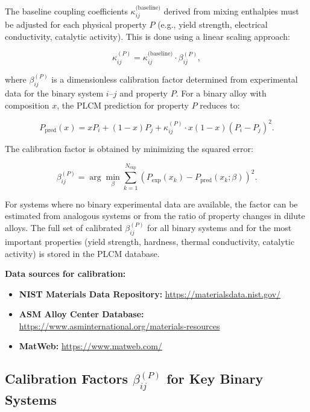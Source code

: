 \documentclass[12pt,a4paper]{article}
\begin{document}
	The baseline coupling coefficients \(\kappa_{ij}^{\text{(baseline)}}\) derived from mixing enthalpies must be adjusted for each physical property \(P\) (e.g., yield strength, electrical conductivity, catalytic activity). This is done using a linear scaling approach:
	
	\begin{equation}
		\kappa_{ij}^{(P)} = \kappa_{ij}^{\text{(baseline)}} \cdot \beta_{ij}^{(P)},
		\label{eq:kappa-calibration}
	\end{equation}
	
	where \(\beta_{ij}^{(P)}\) is a dimensionless calibration factor determined from experimental data for the binary system \(i\)–\(j\) and property \(P\). For a binary alloy with composition \(x\), the PLCM prediction for property \(P\) reduces to:
	
	\begin{equation}
		P_{\text{pred}}(x) = x P_i + (1-x) P_j + \kappa_{ij}^{(P)} \cdot x(1-x) (P_i - P_j)^2.
		\label{eq:binary-prediction}
	\end{equation}
	
	The calibration factor is obtained by minimizing the squared error:
	
	\begin{equation}
		\beta_{ij}^{(P)} = \arg\min_{\beta} \sum_{k=1}^{N_{\text{exp}}} \left( P_{\text{exp}}(x_k) - P_{\text{pred}}(x_k;\beta) \right)^2.
		\label{eq:beta-optimization}
	\end{equation}
	
	For systems where no binary experimental data are available, the factor can be estimated from analogous systems or from the ratio of property changes in dilute alloys. The full set of calibrated \(\beta_{ij}^{(P)}\) for all binary systems and for the most important properties (yield strength, hardness, thermal conductivity, catalytic activity) is stored in the PLCM database.
	
	\textbf{Data sources for calibration:}
	\begin{itemize}
		\item \textbf{NIST Materials Data Repository:} \url{https://materialsdata.nist.gov/}
		\item \textbf{ASM Alloy Center Database:} \url{https://www.asminternational.org/materials-resources}
		\item \textbf{MatWeb:} \url{https://www.matweb.com/}
	\end{itemize}
	
	\subsection{Calibration Factors \(\beta_{ij}^{(P)}\) for Key Binary Systems}
	\label{subsec:beta-table}
	
\end{document}
